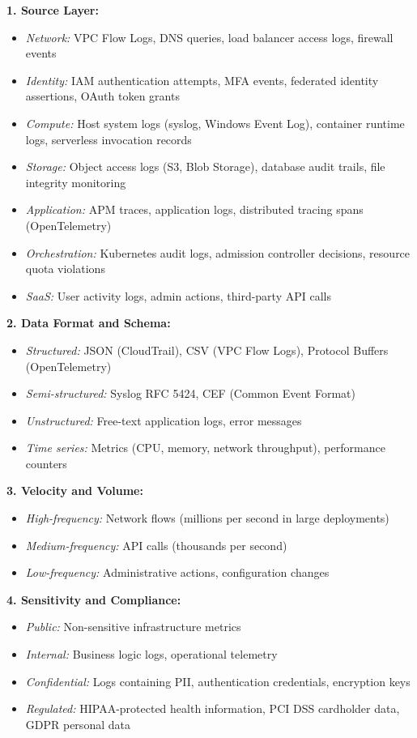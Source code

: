 \textbf{1. Source Layer:}
\begin{itemize}
    \item \emph{Network:} VPC Flow Logs, DNS queries, load balancer access logs, firewall events
    \item \emph{Identity:} IAM authentication attempts, MFA events, federated identity assertions, OAuth token grants
    \item \emph{Compute:} Host system logs (syslog, Windows Event Log), container runtime logs, serverless invocation records
    \item \emph{Storage:} Object access logs (S3, Blob Storage), database audit trails, file integrity monitoring
    \item \emph{Application:} APM traces, application logs, distributed tracing spans (OpenTelemetry)
    \item \emph{Orchestration:} Kubernetes audit logs, admission controller decisions, resource quota violations
    \item \emph{SaaS:} User activity logs, admin actions, third-party API calls
\end{itemize}

\textbf{2. Data Format and Schema:}
\begin{itemize}
    \item \emph{Structured:} JSON (CloudTrail), CSV (VPC Flow Logs), Protocol Buffers (OpenTelemetry)
    \item \emph{Semi-structured:} Syslog RFC 5424, CEF (Common Event Format)
    \item \emph{Unstructured:} Free-text application logs, error messages
    \item \emph{Time series:} Metrics (CPU, memory, network throughput), performance counters
\end{itemize}

\textbf{3. Velocity and Volume:}
\begin{itemize}
    \item \emph{High-frequency:} Network flows (millions per second in large deployments)
    \item \emph{Medium-frequency:} API calls (thousands per second)
    \item \emph{Low-frequency:} Administrative actions, configuration changes
\end{itemize}

\textbf{4. Sensitivity and Compliance:}
\begin{itemize}
    \item \emph{Public:} Non-sensitive infrastructure metrics
    \item \emph{Internal:} Business logic logs, operational telemetry
    \item \emph{Confidential:} Logs containing PII, authentication credentials, encryption keys
    \item \emph{Regulated:} HIPAA-protected health information, PCI DSS cardholder data, GDPR personal data
\end{itemize}

